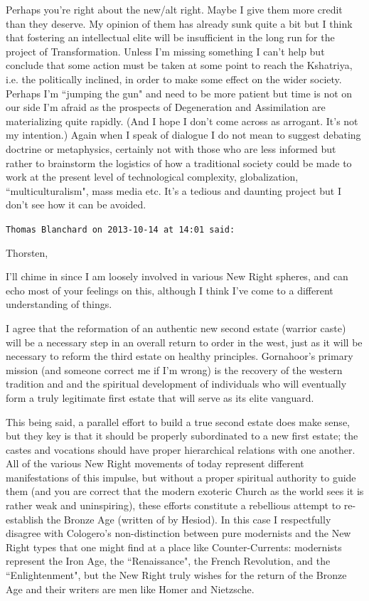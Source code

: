 \begin{footnotesize}
\begin{sffamily}
Perhaps you're right about the new/alt right. Maybe I give them more credit than they deserve. My
opinion of them has already sunk quite a bit but I think that fostering an intellectual elite will be insufficient in
the long run for the project of Transformation. Unless I'm missing something I
can't help but conclude that some action must be taken at some point to reach the Kshatriya, i.e.
the politically inclined, in order to make some effect on the wider society. Perhaps I'm ``jumping
the gun" and need to be more patient but time is not on our side I'm afraid as the prospects of
Degeneration and Assimilation are materializing quite rapidly. (And I hope I don't come across as
arrogant. It's not my intention.) Again when I speak of dialogue I do not mean to suggest debating
doctrine or metaphysics, certainly not with those who are less informed but rather to brainstorm the logistics of how a
traditional society could be made to work at the present level of technological complexity, globalization,
``multiculturalism", mass media etc. It's a tedious and daunting project but I
don't see how it can be avoided.


\hfill

\texttt{Thomas Blanchard on 2013-10-14 at 14:01 said: }

Thorsten,

I'll chime in since I am loosely involved in various New Right spheres, and can echo most of your
feelings on this, although I think I've come to a different understanding of things.

I agree that the reformation of an authentic new second estate (warrior caste) will be a necessary step in an overall
return to order in the west, just as it will be necessary to reform the third estate on healthy principles.
Gornahoor's primary mission (and someone correct me if I'm wrong) is the
recovery of the western tradition and and the spiritual development of individuals who will eventually form a truly
legitimate first estate that will serve as its elite vanguard.

This being said, a parallel effort to build a true second estate does make sense, but they key is that it should be
properly subordinated to a new first estate; the castes and vocations should have proper hierarchical relations with
one another. All of the various New Right movements of today represent different manifestations of this impulse, but
without a proper spiritual authority to guide them (and you are correct that the modern exoteric Church as the world
sees it is rather weak and uninspiring), these efforts constitute a rebellious attempt to re-establish the Bronze Age
(written of by Hesiod). In this case I respectfully disagree with Cologero's non-distinction
between pure modernists and the New Right types that one might find at a place like Counter-Currents: modernists
represent the Iron Age, the ``Renaissance", the French Revolution, and the ``Enlightenment", but the New Right truly
wishes for the return of the Bronze Age and their writers are men like Homer and Nietzsche.


\end{sffamily}
\end{footnotesize}
